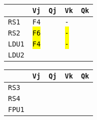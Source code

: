 \begin{enumerate}
    \begin{minipage}{0.45\textwidth}
        \centering
        \begin{tabular}{@{} l | l l l l @{}}
            \toprule
                & \texttt{Vj} & \texttt{Qj} & \texttt{Vk} & \texttt{Qk} \\
            \midrule
            \texttt{RS1} & \texttt{F4} & & \texttt{-} & \\ [.3em]
            \texttt{RS2} & \hl{\texttt{F6}} & & \hl{\texttt{-}} & \\
            \cmidrule{1-5}
            \texttt{LDU1} & \hl{\texttt{F4}} & & \hl{\texttt{-}} & \\ [.3em]
            \texttt{LDU2} & & & & \\
            \bottomrule
        \end{tabular}
    \end{minipage}
    \hfill
    \begin{minipage}{0.45\textwidth}
        \centering
        \begin{tabular}{@{} l | l l l l @{}}
            \toprule
            & \texttt{Vj} & \texttt{Qj} & \texttt{Vk} & \texttt{Qk} \\
            \midrule
            \texttt{RS3} & & & & \\ [.3em]
            \texttt{RS4} & & & & \\
            \cmidrule{1-5}
            \texttt{FPU1} & & & & \\
            \bottomrule
        \end{tabular}
    \end{minipage}


\end{enumerate}
